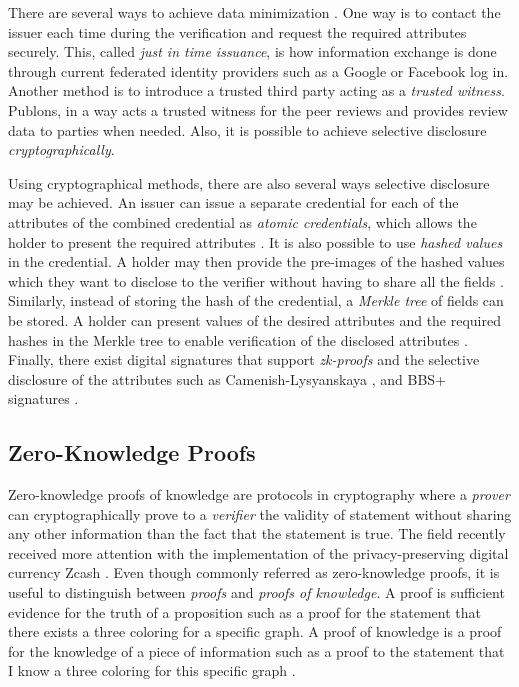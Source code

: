 There are several ways to achieve data minimization \parencite{Helmy.8May2020}. One way is to contact the issuer each time during the verification and request the required attributes securely. This, called \textit{just in time issuance}, is how information exchange is done through current federated identity providers such as a Google or Facebook log in. Another method is to introduce a trusted third party acting as a \textit{trusted witness}. Publons, in a way acts a trusted witness for the peer reviews and provides review data to parties when needed. Also, it is possible to achieve selective disclosure \textit{cryptographically}. 

Using cryptographical methods, there are also several ways selective disclosure may be achieved. An issuer can issue a separate credential for each of the attributes of the combined credential as \textit{atomic credentials}, which allows the holder to present the required attributes \parencite{Chadwick.2019}. It is also possible to use \textit{hashed values} in the credential. A holder may then provide the pre-images of the hashed values which they want to disclose to the verifier without having to share all the fields \parencite[961]{R.Mukta.2020}. Similarly, instead of storing the hash of the credential, a \textit{Merkle tree} of fields can be stored. A holder can present values of the desired attributes and the required hashes in the Merkle tree to enable verification of the disclosed attributes \parencite{Hitchens.9Eyl2018}. Finally, there exist digital signatures that support \textit{\acrfull{zk-proofs}} and the selective disclosure of the attributes such as Camenish-Lysyanskaya \parencite{camenisch2002signature}, and BBS+ signatures \parencite{boneh2004short, camenisch2016anonymous, lodder_looker_2020}.


\subsection{Zero-Knowledge Proofs}

Zero-knowledge proofs of knowledge are protocols in cryptography where a \textit{prover} can cryptographically prove to a \textit{verifier} the validity of statement without sharing any other information than the fact that the statement is true. The field recently received more attention with the implementation of the privacy-preserving digital currency Zcash \parencite{E.BenSasson.2016}. Even though commonly referred as zero-knowledge proofs, it is useful to distinguish between \textit{proofs} and \textit{proofs of knowledge}. A proof is sufficient evidence for the truth of a proposition such as a proof for the statement that there exists a three coloring for a specific graph. A proof of knowledge is a proof for the knowledge of a piece of information such as a proof to the statement that I know a three coloring for this specific graph \parencite{green_2017}. 

